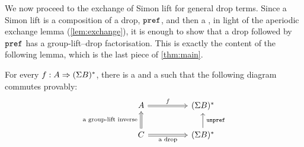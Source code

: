 We now proceed to the exchange of Simon lift for general drop terms. Since a Simon lift is a composition of a drop, $\mathtt{pref}$, and then a , in light of the aperiodic exchange lemma (\cref{lem:exchange}), it is enough to show that a drop followed by $\mathtt{pref}$ has a group-lift--drop factorisation. This is exactly the content of the following lemma, which is the last piece of \cref{thm:main}.

\begin{lemma}
    For every  $f : A \Rightarrow (\Sigma B)^*$, there is a  and a  such that the following diagram commutes provably:
    \[
    \begin{tikzcd}[column sep=huge]
        A
        \ar[r, \dropar, "f"]
        &(\Sigma B)^*
        \\
        C
        \ar[u, \dropar, "\text{a group-lift inverse}"{xshift=-0.5ex}]
        \ar[r, \dropar, "\text{a drop}"']
        &(\Sigma B)^*
        \ar[u, "\unprefterm"'{xshift=0.5ex}]
    \end{tikzcd}
    \]
\end{lemma}

